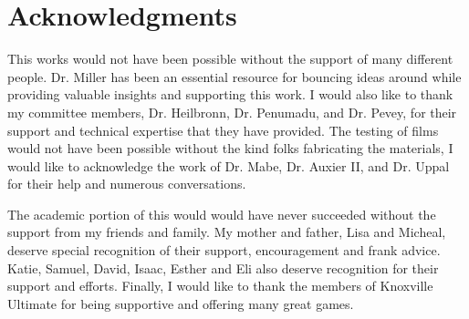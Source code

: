 \chapter*{Acknowledgments}

This works would not have been possible without the support of many different people.
Dr. Miller has been an essential resource for bouncing ideas around while providing valuable insights and supporting this work.
I would also like to thank my committee members, Dr. Heilbronn, Dr. Penumadu, and Dr. Pevey, for their support and technical expertise that they have provided. 
The testing of films would not have been possible without the kind folks fabricating the materials, I would like to acknowledge the work of Dr. Mabe, Dr. Auxier II, and Dr. Uppal for their help and numerous conversations.

The academic portion of this would would have never succeeded without the support from my friends and family. 
My mother and father, Lisa and Micheal, deserve special recognition of their support, encouragement and frank advice. 
Katie, Samuel, David, Isaac, Esther and Eli also deserve recognition for their support and efforts. 
Finally, I would like to thank the members of Knoxville Ultimate for being supportive and offering many great games.
